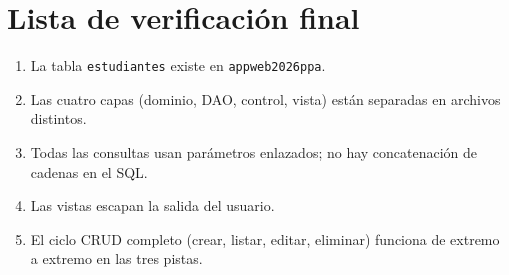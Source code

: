 \section{Lista de verificación final}
\label{ap:crud:checklist}

\begin{enumerate}
\item La tabla \texttt{estudiantes} existe en \texttt{appweb2026ppa}.
\item Las cuatro capas (dominio, DAO, control, vista) están separadas
en archivos distintos.
\item Todas las consultas usan parámetros enlazados; no hay
concatenación de cadenas en el SQL.
\item Las vistas escapan la salida del usuario.
\item El ciclo CRUD completo (crear, listar, editar, eliminar) funciona
de extremo a extremo en las tres pistas.
\end{enumerate}
